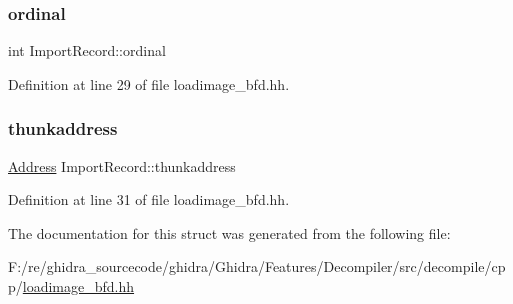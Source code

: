 \subsubsection{\texorpdfstring{ordinal}{ordinal}}
{\footnotesize\ttfamily int Import\+Record\+::ordinal}



Definition at line 29 of file loadimage\+\_\+bfd.\+hh.

\mbox{\label{struct_import_record_a58ca19ffc40f14f44e4a0dd507f4f28d}} 
\subsubsection{\texorpdfstring{thunkaddress}{thunkaddress}}
{\footnotesize\ttfamily \mbox{\hyperlink{class_address}{Address}} Import\+Record\+::thunkaddress}



Definition at line 31 of file loadimage\+\_\+bfd.\+hh.



The documentation for this struct was generated from the following file\+:\begin{DoxyCompactItemize}
\item 
F\+:/re/ghidra\+\_\+sourcecode/ghidra/\+Ghidra/\+Features/\+Decompiler/src/decompile/cpp/\mbox{\hyperlink{loadimage__bfd_8hh}{loadimage\+\_\+bfd.\+hh}}\end{DoxyCompactItemize}
